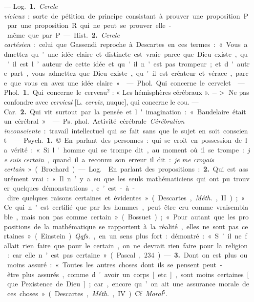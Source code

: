 \begin{itemize}[leftmargin=1cm, label=, itemsep=11pt]
 — \si{Log.} {\bf 1.} {\it Cercle vicieux} : sorte
de pétition de principe consistant
à prouver une proposition P par
une proposition R qui ne peut se
prouver elle-même que par P.

— \si{Hist.} {\bf 2.} {\it Cercle cartésien} : celui
que Gassendi reproche à Descartes
en ces termes : « Vous admettez
qu’une idée claire et distincte est
vraie parce que Dieu existe, qu'il
est l’auteur de cette idée et qu'il
n'est pas trompeur; et d'autre part,
vous admettez que Dieu existe, qu'il
est créateur et vérace, parce que
vous en avez une idée claire. »

 — \si{Phol.} Qui concerne
le cervelet.

 — \si{Phol.} {\bf 1.} Qui concerne le
cerveau$^2$ : « Les hémisphères cérébraux ». $->$ Ne pas confondre avec
{\it cervical} [L. {\it cervix}, nuque], qui concerne le cou. — \si{Car.} {\bf 2.} Qui vit surtout par la pensée et l'imagination :
« Baudelaire était un cérébral. »

 — \si{Ps. phol.} Activité
cérébrale. {\it Cérébration inconsciente} :
travail intellectuel qui se fait sans
que le sujet en soit conscient.

 — \si{Psych.} {\bf 1.} © En parlant des
personnes : qui se croit en possession de la vérité : « Si l'homme qui se
trompe dit, au moment où il se
trompe : {\it je suis certain}, quand il a
reconnu son erreur il dit : {\it je me
croyais certain} » (Brochard).

— \si{Log.}  En parlant des propositions : {\bf 2.} Qui est assurément vrai:
« Il n’y a eu que les seuls mathématiciens qui ont pu trouver quelques
démonstrations, c’est-à-dire quelques
raisons certaines et évidentes »
(Descartes, {\it Méth.}, II); « Ce qui n’est
certifié que par les hommes, peut
être cru comme vraisemblable, mais
non pas comme certain » (Bossuet);
« Pour autant que les propositions
de la mathématique se rapportent
à la réalité, elles ne sont pas certaines » (Einstein). {\it Qqfs.}, en un sens
plus fort : démontré : « S’il ne fallait
rien faire que pour le certain, on ne
devrait rien faire pour la religion:
car elle n’est pas certaine » (Pascal,
234). — {\bf 3.} Dont on est plus ou
moins assuré : « Toutes les autres
choses dont ils se pensent peut-être
plus assurés, comme d'avoir un
corps [etc.], sont moins certaines
[que Pexistence de Dieu]; car, encore
qu’on ait une assurance morale de
ces choses... » (Descartes, {\it Méth.}, IV).
Cf. {\it Moral}$^5$.


\end{itemize}
